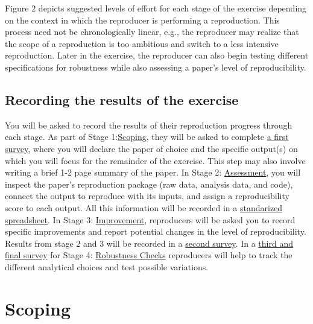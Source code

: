 \documentclass[]{book}
\begin{document}
Figure 2 depicts suggested levels of effort for each stage of the exercise depending on the context in which the reproducer is performing a reproduction. This process need not be chronologically linear, e.g., the reproducer may realize that the scope of a reproduction is too ambitious and switch to a less intensive reproduction. Later in the exercise, the reproducer can also begin testing different specifications for robustness while also assessing a paper's level of reproducibility.

\hypertarget{recording-the-results-of-the-exercise}{%
\section*{Recording the results of the exercise}\label{recording-the-results-of-the-exercise}}

You will be asked to record the results of their reproduction progress through each stage. As part of Stage 1:\protect\hyperlink{scoping}{Scoping}, they will be asked to complete \href{https://berkeley.qualtrics.com/jfe/form/SV_8hLHNI6LGSYchEN}{a first survey}, where you will declare the paper of choice and the specific output(s) on which you will focus for the remainder of the exercise. This step may also involve writing a brief 1-2 page summary of the paper. In Stage 2: \protect\hyperlink{assessment}{Assessment}, you will inspect the paper's reproduction package (raw data, analysis data, and code), connect the output to reproduce with its inputs, and assign a reproducibility score to each output. All this information will be recorded in a \href{https://docs.google.com/spreadsheets/d/1Uj5rEwSpFh_RXsmRhFnbz8cL88PUA5cRKp_38xV4eeE/copy?usp=sharing}{standarized spreadsheet}. In Stage 3: \protect\hyperlink{improvements}{Improvement}, reproducers will be asked you to record specific improvements and report potential changes in the level of reproducibility. Results from stage 2 and 3 will be recorded in a \href{ADD\%20LINK}{second survey}. In a \href{ADD\%20LINK}{third and final survey} for Stage 4: \protect\hyperlink{robust}{Robustness Checks} reproducers will help to track the different analytical choices and test possible variations.

\hypertarget{scoping}{%
\chapter{Scoping}\label{scoping}}
\end{document}

